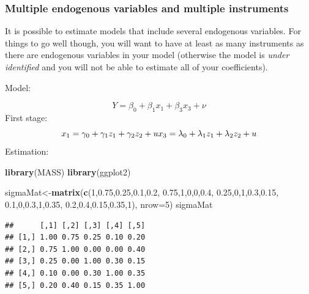 \documentclass[
]{article}
\newenvironment{Shaded}{\begin{snugshade}}{\end{snugshade}}
\newcommand{\DataTypeTok}[1]{\textcolor[rgb]{0.13,0.29,0.53}{#1}}
\newcommand{\DecValTok}[1]{\textcolor[rgb]{0.00,0.00,0.81}{#1}}
\newcommand{\FloatTok}[1]{\textcolor[rgb]{0.00,0.00,0.81}{#1}}
\newcommand{\KeywordTok}[1]{\textcolor[rgb]{0.13,0.29,0.53}{\textbf{#1}}}
\newcommand{\NormalTok}[1]{#1}
\begin{document}
\subsubsection{Multiple endogenous variables and multiple instruments}

It is possible to estimate models that include several endogenous
variables. For things to go well though, you will want to have at least
as many instruments as there are endogenous variables in your model
(otherwise the model is \textit{under identified} and you will not be
able to estimate all of your coefficients).

Model:

\[
Y=\beta_0+\beta_1 x_{1}+\beta_3x_3+\nu
\] First stage: \[
x_1=\gamma_0+\gamma_1z_1+\gamma_2z_2+u\\
x_3=\lambda_0+\lambda_1z_1+\lambda_2z_2+u
\] Estimation:

\begin{Shaded}
\begin{Highlighting}[]
\KeywordTok{library}\NormalTok{(MASS)}
\KeywordTok{library}\NormalTok{(ggplot2)}

\NormalTok{sigmaMat\textless{}{-}}\KeywordTok{matrix}\NormalTok{(}\KeywordTok{c}\NormalTok{(}\DecValTok{1}\NormalTok{,}\FloatTok{0.75}\NormalTok{,}\FloatTok{0.25}\NormalTok{,}\FloatTok{0.1}\NormalTok{,}\FloatTok{0.2}\NormalTok{,}
                   \FloatTok{0.75}\NormalTok{,}\DecValTok{1}\NormalTok{,}\DecValTok{0}\NormalTok{,}\DecValTok{0}\NormalTok{,}\FloatTok{0.4}\NormalTok{,}
                   \FloatTok{0.25}\NormalTok{,}\DecValTok{0}\NormalTok{,}\DecValTok{1}\NormalTok{,}\FloatTok{0.3}\NormalTok{,}\FloatTok{0.15}\NormalTok{,}
                   \FloatTok{0.1}\NormalTok{,}\DecValTok{0}\NormalTok{,}\FloatTok{0.3}\NormalTok{,}\DecValTok{1}\NormalTok{,}\FloatTok{0.35}\NormalTok{,}
                   \FloatTok{0.2}\NormalTok{,}\FloatTok{0.4}\NormalTok{,}\FloatTok{0.15}\NormalTok{,}\FloatTok{0.35}\NormalTok{,}\DecValTok{1}\NormalTok{), }\DataTypeTok{nrow=}\DecValTok{5}\NormalTok{)}
\NormalTok{sigmaMat}
\end{Highlighting}
\end{Shaded}

\begin{verbatim}
##      [,1] [,2] [,3] [,4] [,5]
## [1,] 1.00 0.75 0.25 0.10 0.20
## [2,] 0.75 1.00 0.00 0.00 0.40
## [3,] 0.25 0.00 1.00 0.30 0.15
## [4,] 0.10 0.00 0.30 1.00 0.35
## [5,] 0.20 0.40 0.15 0.35 1.00
\end{verbatim}
\end{document}
